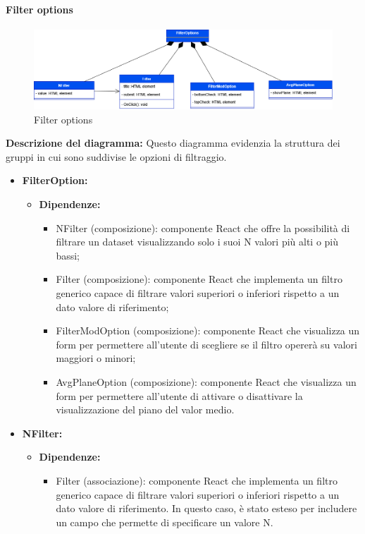 \paragraph{Filter options}
\begin{figure}[h!] \centering
    \includegraphics[scale=0.45]{template/images/uml_front/ui/filteroptions.png}
    \caption{Filter options}
\end{figure}
\textbf{Descrizione del diagramma:}
Questo diagramma evidenzia la struttura dei gruppi in cui sono suddivise le opzioni di filtraggio.
\begin{itemize}
    \item \textbf{FilterOption:}
    \begin{itemize}
        \item \textbf{Dipendenze:}
        \begin{itemize}
            \item NFilter (composizione): componente React che offre la possibilità di filtrare un dataset visualizzando solo i suoi N valori più alti o più bassi;
            \item Filter (composizione): componente React che implementa un filtro generico capace di filtrare valori superiori o inferiori rispetto a un dato valore di riferimento;
            \item FilterModOption (composizione): componente React che visualizza un form per permettere all'utente di scegliere se il filtro opererà su valori maggiori o minori;
            \item AvgPlaneOption (composizione): componente React che visualizza un form per permettere all'utente di attivare o disattivare la visualizzazione del piano del valor medio.
        \end{itemize} 
    \end{itemize}

    \item \textbf{NFilter:}
    \begin{itemize}
        \item \textbf{Dipendenze:}
        \begin{itemize}
            \item Filter (associazione): componente React che implementa un filtro generico capace di filtrare valori superiori o inferiori rispetto a un dato valore di riferimento.
            In questo caso, è stato esteso per includere un campo che permette di specificare un valore N.
        \end{itemize} 
    \end{itemize}
\end{itemize}

